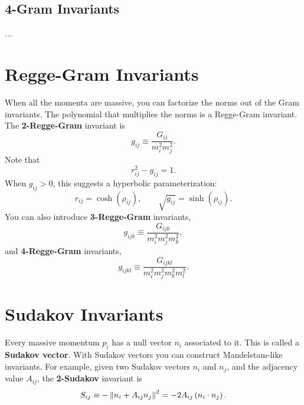\subsection{4-Gram Invariants}
...
\section{Regge-Gram Invariants}
When all the momenta are massive, you can factorize the norms out of the Gram invariants. The polynomial that multiplies the norms is a Regge-Gram invariant. The \textbf{2-Regge-Gram} invariant is
\begin{equation}
	g_{ij} \equiv \frac{G_{ij}}{m_{i}^{2} m_{j}^{2}}.
\end{equation}
Note that
\begin{equation}
	r_{ij}^{2} - g_{ij} = 1.
\end{equation}
When $g_{ij} > 0$, this suggests a hyperbolic parameterization:
\begin{equation}
	r_{ij} = \operatorname{cosh}{\left( \rho_{ij} \right)}, \qquad \sqrt{g_{ij}} = \operatorname{sinh}{\left( \rho_{ij} \right)}.
\end{equation}
You can also introduce \textbf{3-Regge-Gram} invariants,
\begin{equation}
	g_{ijk} \equiv \frac{G_{ijk}}{m_{i}^{2} m_{j}^{2} m_{k}^{2}},
\end{equation}
and \textbf{4-Regge-Gram} invariants,
\begin{equation}
	g_{ijkl} \equiv \frac{G_{ijkl}}{m_{i}^{2} m_{j}^{2} m_{k}^{2} m_{l}^{2}}.
\end{equation}
\section{Sudakov Invariants}
Every massive momentum $p_{i}$ has a null vector $n_{i}$ associated to it. This is called a \textbf{Sudakov vector}. With Sudakov vectors you can construct Mandelstam-like invariants. For example, given two Sudakov vectors $n_{i}$ and $n_{j}$, and the adjacency value $A_{ij}$, the \textbf{2-Sudakov} invariant is
\begin{equation}
	S_{ij} \equiv - \left\Vert n_{i} + A_{ij} n_{j} \right\Vert^{2} = - 2 A_{ij} \left( n_{i} \cdot n_{j} \right).
\end{equation}
